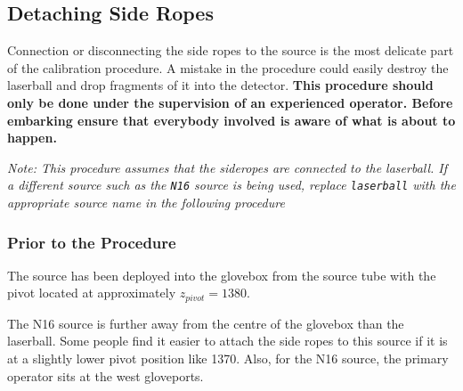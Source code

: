 \documentclass[11pt]{article}
\begin{document}
\subsection{Detaching Side Ropes}

Connection or disconnecting the side ropes to the source is the most delicate part of the calibration procedure. A mistake in the procedure could easily destroy the laserball and drop fragments of it into the detector. {\bf This procedure should only be done under the supervision of an experienced operator. Before embarking ensure that everybody involved is aware of what is about to happen.}

{\it  Note: This procedure assumes that the sideropes  are connected to the laserball. If a different source such as the \verb+N16+ source is being used, replace \verb+laserball+ with the appropriate source name in the following procedure}

\subsubsection{Prior to the Procedure}
 The source has been deployed into the glovebox from the source tube with the pivot located at approximately $z_{pivot}=1380$.

The N16 source is further away from the centre of the glovebox than the laserball. Some people find it easier to attach the side ropes to this source if it is at a slightly lower pivot position like 1370. Also, for the N16 source, the primary operator sits at the west gloveports.
\end{document}
